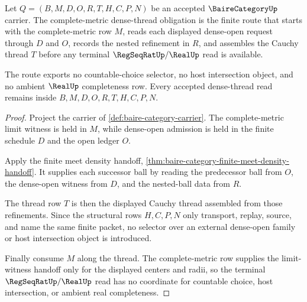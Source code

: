 \begin{theorem}
\label{thm:baire-category-complete-metric-dense-thread}
Let $Q=(B,M,D,O,R,T,H,C,P,N)$ be an accepted $\BaireCategoryUp$ carrier. The complete-metric dense-thread obligation is the finite route that starts with the complete-metric row $M$, reads each displayed dense-open request through $D$ and $O$, records the nested refinement in $R$, and assembles the Cauchy thread $T$ before any terminal $\RegSeqRatUp/\RealUp$ read is available.

The route exports no countable-choice selector, no host intersection object, and no ambient $\RealUp$ completeness row. Every accepted dense-thread read remains inside $B,M,D,O,R,T,H,C,P,N$.
\end{theorem}
\begin{proof}
Project the carrier of \autoref{def:baire-category-carrier}. The complete-metric limit witness is held in $M$, while dense-open admission is held in the finite schedule $D$ and the open ledger $O$.

Apply the finite meet density handoff, \autoref{thm:baire-category-finite-meet-density-handoff}. It supplies each successor ball by reading the predecessor ball from $O$, the dense-open witness from $D$, and the nested-ball data from $R$.

The thread row $T$ is then the displayed Cauchy thread assembled from those refinements. Since the structural rows $H,C,P,N$ only transport, replay, source, and name the same finite packet, no selector over an external dense-open family or host intersection object is introduced.

Finally consume $M$ along the thread. The complete-metric row supplies the limit-witness handoff only for the displayed centers and radii, so the terminal $\RegSeqRatUp/\RealUp$ read has no coordinate for countable choice, host intersection, or ambient real completeness.
\end{proof}

